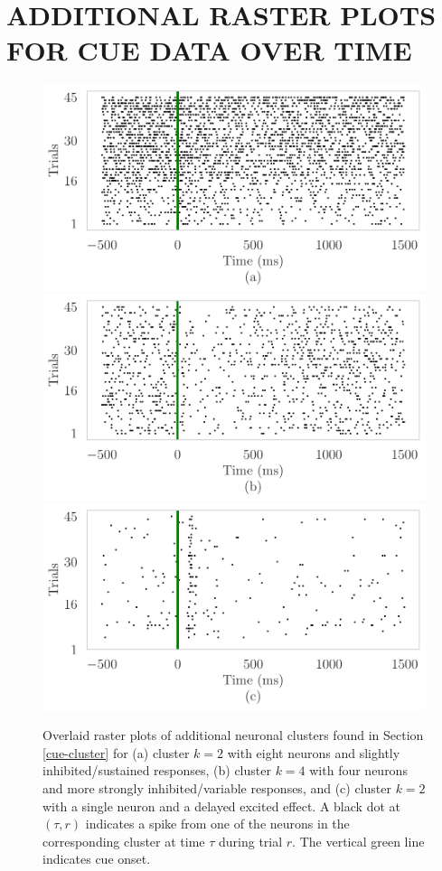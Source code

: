 \documentclass[twoside]{article}
\begin{document}
\section{ADDITIONAL RASTER PLOTS FOR CUE DATA OVER TIME} \label{raster-plots}
\begin{figure}[H]
\begin{center}
\includegraphics[scale=0.5]{../img/cue-raster-appa.pdf}
\includegraphics[scale=0.5]{../img/cue-raster-appb.pdf}
\includegraphics[scale=0.5]{../img/cue-raster-appc.pdf}
\end{center}
\vspace{-4mm}
\caption{Overlaid raster plots of additional neuronal clusters found in Section \ref{cue-cluster} for (a) cluster $k =2$ with eight neurons and slightly inhibited/sustained responses, (b) cluster $k = 4$ with four neurons and more strongly inhibited/variable responses, and (c) cluster $k = 2$ with a single neuron and a delayed excited effect.  A black dot at $(\tau, r)$ indicates a spike from one of the neurons in the corresponding cluster at time $\tau$ during trial $r$. The vertical green line indicates cue onset.} \label{cue-rasters}
\end{figure}
\end{document}
